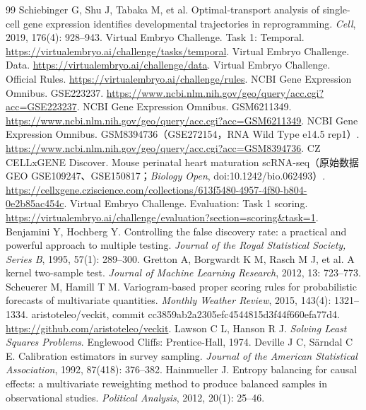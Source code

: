 \documentclass[UTF8,zihao=-4,fontset=none,a4paper]{ctexart}
\begin{document}
\clearpage
\begingroup
\small
\setlength{\parskip}{0pt}
\begin{thebibliography}{99}
\setlength{\itemsep}{2pt}
Schiebinger G, Shu J, Tabaka M, et al. Optimal-transport analysis of single-cell gene expression identifies developmental trajectories in reprogramming. \textit{Cell}, 2019, 176(4): 928--943.
Virtual Embryo Challenge. Task 1: Temporal. \url{https://virtualembryo.ai/challenge/tasks/temporal}.
Virtual Embryo Challenge. Data. \url{https://virtualembryo.ai/challenge/data}.
Virtual Embryo Challenge. Official Rules. \url{https://virtualembryo.ai/challenge/rules}.
NCBI Gene Expression Omnibus. GSE223237. \url{https://www.ncbi.nlm.nih.gov/geo/query/acc.cgi?acc=GSE223237}.
NCBI Gene Expression Omnibus. GSM6211349. \url{https://www.ncbi.nlm.nih.gov/geo/query/acc.cgi?acc=GSM6211349}.
NCBI Gene Expression Omnibus. GSM8394736（GSE272154，RNA Wild Type e14.5 rep1）. \url{https://www.ncbi.nlm.nih.gov/geo/query/acc.cgi?acc=GSM8394736}.
CZ CELLxGENE Discover. Mouse perinatal heart maturation scRNA-seq（原始数据 GEO GSE109247、GSE150817；\textit{Biology Open}, doi:10.1242/bio.062493）. \url{https://cellxgene.cziscience.com/collections/613f5480-4957-4f80-b804-0e2b85ac454c}.
Virtual Embryo Challenge. Evaluation: Task 1 scoring. \url{https://virtualembryo.ai/challenge/evaluation?section=scoring&task=1}.
Benjamini Y, Hochberg Y. Controlling the false discovery rate: a practical and powerful approach to multiple testing. \textit{Journal of the Royal Statistical Society, Series B}, 1995, 57(1): 289--300.
Gretton A, Borgwardt K M, Rasch M J, et al. A kernel two-sample test. \textit{Journal of Machine Learning Research}, 2012, 13: 723--773.
Scheuerer M, Hamill T M. Variogram-based proper scoring rules for probabilistic forecasts of multivariate quantities. \textit{Monthly Weather Review}, 2015, 143(4): 1321--1334.
aristoteleo/veckit, commit cc3859ab2a2305efc4544815d3f44f660efa77d4. \url{https://github.com/aristoteleo/veckit}.
Lawson C L, Hanson R J. \textit{Solving Least Squares Problems}. Englewood Cliffs: Prentice-Hall, 1974.
Deville J C, S\"arndal C E. Calibration estimators in survey sampling. \textit{Journal of the American Statistical Association}, 1992, 87(418): 376--382.
Hainmueller J. Entropy balancing for causal effects: a multivariate reweighting method to produce balanced samples in observational studies. \textit{Political Analysis}, 2012, 20(1): 25--46.

\end{thebibliography}
\end{document}
